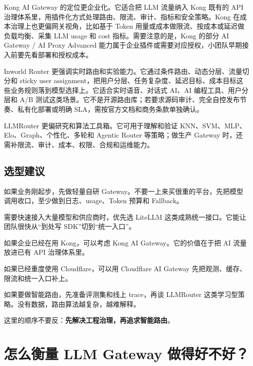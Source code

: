 \documentclass[9pt,a4paper,twocolumn]{ctexart}
\begin{document}
Kong AI Gateway 的定位更企业化。它适合把 LLM 流量纳入 Kong 既有的 API 治理体系里，用插件化方式处理路由、限流、审计、指标和安全策略。Kong 在成本治理上也更偏网关视角，比如基于 Token 用量或成本做限流、按成本或延迟做负载均衡、采集 LLM usage 和 cost 指标。需要注意的是，Kong 的部分 AI Gateway / AI Proxy Advanced 能力属于企业插件或需要对应授权，小团队早期接入前要先看部署和授权成本。



Inworld Router 更强调实时路由和实验能力。它通过条件路由、动态分层、流量切分和 sticky user assignment，把用户分层、任务复杂度、延迟目标、成本目标这些业务规则落到模型选择上。它适合实时语音、对话式 AI、AI 编程工具、用户分层和 A/B 测试这类场景。它不是开源路由库；若要求源码审计、完全自控发布节奏、私有化部署或明确 SLA，需按官方文档和商务条款单独确认。



LLMRouter 更偏研究和算法工具箱。它可用于理解和验证 KNN、SVM、MLP、Elo、Graph、个性化、多轮和 Agentic Router 等策略；做生产 Gateway 时，还需补限流、审计、成本、权限、合规和运维能力。



\subsection*{选型建议}


如果业务刚起步，先做轻量自研 Gateway。不要一上来买很重的平台，先把模型调用收口，至少做到日志、usage、Token 预算和 Fallback。



需要快速接入大量模型和供应商时，优先选 LiteLLM 这类成熟统一接口。它能让团队很快从“到处写 SDK”切到“统一入口”。



如果企业已经在用 Kong，可以考虑 Kong AI Gateway。它的价值在于把 AI 流量放进已有 API 治理体系里。



如果已经重度使用 Cloudflare，可以用 Cloudflare AI Gateway 先把观测、缓存、限流和统一入口补上。



如果要做智能路由，先准备评测集和线上 trace，再谈 LLMRouter 这类学习型策略。没有数据，路由算法越复杂，越难解释。



这里的顺序不要反：\textbf{先解决工程治理，再追求智能路由}。



\section*{怎么衡量 LLM Gateway 做得好不好？}
\end{document}
